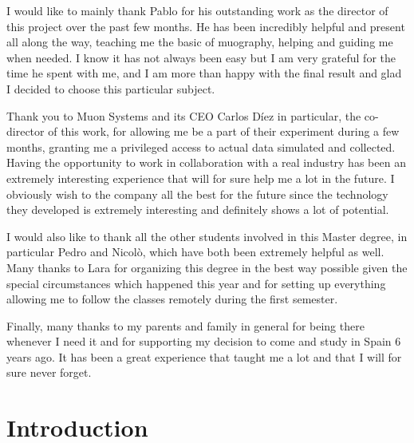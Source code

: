\documentclass[a4paper, 11pt]{report}
\begin{document}
I would like to mainly thank Pablo for his outstanding work as the director of this project over the past few months. He has been incredibly helpful and present all along the way, teaching me the basic of muography, helping and guiding me when needed. I know it has not always been easy but I am very grateful for the time he spent with me, and I am more than happy with the final result and glad I decided to choose this particular subject.

Thank you to Muon Systems and its CEO Carlos D\'iez in particular, the co-director of this work, for allowing me be a part of their experiment during a few months, granting me a privileged access to actual data simulated and collected. Having the opportunity to work in collaboration with a real industry has been an extremely interesting experience that will for sure help me a lot in the future. I obviously wish to the company all the best for the future since the technology they developed is extremely interesting and definitely shows a lot of potential.

I would also like to thank all the other students involved in this Master degree, in particular Pedro and Nicol\`o, which have both been extremely helpful as well. Many thanks to Lara for organizing this degree in the best way possible given the special circumstances which happened this year and for setting up everything allowing me to follow the classes remotely during the first semester.

Finally, many thanks to my parents and family in general for being there whenever I need it and for supporting my decision to come and study in Spain 6 years ago. It has been a great experience that taught me a lot and that I will for sure never forget.  


\newpage


\tableofcontents

\thispagestyle{empty}
\newpage



\chapter{Introduction}
\end{document}

